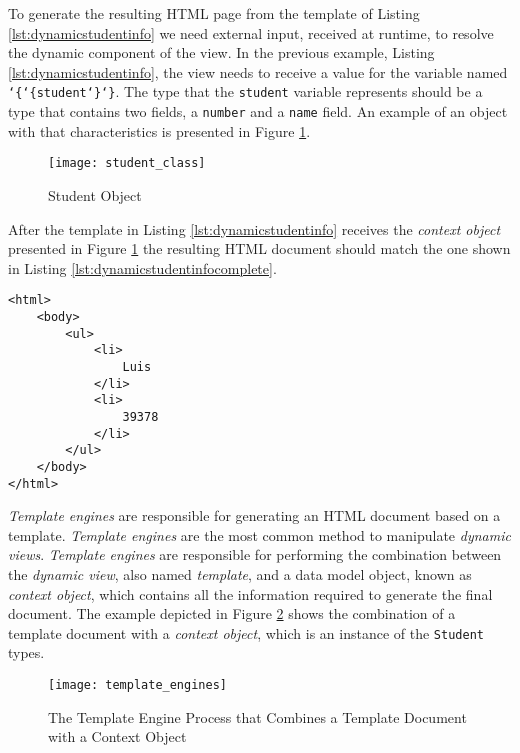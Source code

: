 \noindent
To generate the resulting \ac{HTML} page from the template of Listing \ref{lst:dynamicstudentinfo} we need external input, received at runtime, to resolve the dynamic component of the view. In the previous example, Listing \ref{lst:dynamicstudentinfo}, the view needs to receive a value for the variable named \texttt{\char`\{\char`\{student\char`\}\char`\}}. The type that the \texttt{student} variable represents should be a type that contains two fields, a \texttt{number} and a \texttt{name} field. An example of an object with that characteristics is presented in Figure \ref{img:studentclass}.

\begin{figure}[H]
	\centering
	\texttt{[image: student\_class]}
	\caption{Student Object}
	\label{img:studentclass}
\end{figure}

\noindent
After the template in Listing \ref{lst:dynamicstudentinfo} receives the \textit{context object} presented in Figure \ref{img:studentclass} the resulting \ac{HTML} document should match the one shown in Listing \ref{lst:dynamicstudentinfocomplete}.

\bigskip

\lstset{language=html}

\begin{minipage}{\linewidth}
\begin{lstlisting}[caption={HTML Document with Student Information}, label={lst:dynamicstudentinfocomplete}]
<html>
    <body>
        <ul>
            <li>
                Luis
            </li>
            <li>
                39378
            </li>
        </ul>
    </body>
</html>
\end{lstlisting}
\end{minipage} 

\textit{Template engines} are responsible for generating an \ac{HTML} document based on a template. \textit{Template engines} are the most common method to manipulate \textit{dynamic views}. \textit{Template engines} are responsible for performing the combination between the \textit{dynamic view}, also named \textit{template}, and a data model object, known as \textit{context object}, which contains all the information required to generate the final document. The example depicted in Figure \ref{img:templateengineprocess} shows the combination of a template document with a \textit{context object}, which is an instance of the \texttt{Student} types.

\begin{figure}[H]
	\centering
	\texttt{[image: template\_engines]}
	\caption{The Template Engine Process that Combines a Template Document with a Context Object}
	\label{img:templateengineprocess}
\end{figure}

